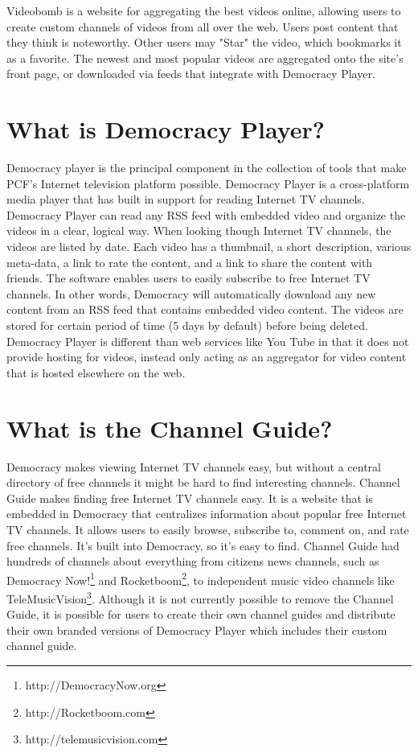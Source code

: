 \documentclass[a4paper,12pt]{report}
\begin{document}
Videobomb is a website for aggregating the best videos online, allowing users to create custom channels of videos from all over the web.
Users post content that they think is noteworthy.
Other users may "Star" the video, which bookmarks it as a favorite.
The newest and most popular videos are aggregated onto the site's front page, or downloaded via feeds that integrate with Democracy Player. 

\section{What is Democracy Player?}
Democracy player is the principal component in the collection of tools that make PCF's Internet television platform possible.
Democracy Player is a cross-platform media player that has built in support for reading Internet TV channels.
Democracy Player can read any RSS feed with embedded video and organize the videos in a clear, logical way.
When looking though Internet TV channels, the videos are listed by date.
Each video has a thumbnail, a short description, various meta-data, a link to rate the content, and a link to share the content with friends.
The software enables users to easily subscribe to free Internet TV channels.
In other words, Democracy will automatically download any new content from an RSS feed that contains embedded video content.
The videos are stored for certain period of time (5 days by default) before being deleted.
Democracy Player is different than web services like You Tube in that it does not provide hosting for videos, instead only acting as an aggregator for video content that is hosted elsewhere on the web.

\section {What is the Channel Guide?}
Democracy makes viewing Internet TV channels easy, but without a central directory of free channels it might be hard to find interesting channels.
Channel Guide makes finding free Internet TV channels easy.
It is a website that is embedded in Democracy that centralizes information about popular free Internet TV channels.
It allows users to easily browse, subscribe to, comment on, and rate free channels.
It's built into Democracy, so it's easy to find.
Channel Guide had hundreds of channels about everything from citizens news channels, such as Democracy Now!\footnote { http://DemocracyNow.org} and Rocketboom\footnote {http://Rocketboom.com}, to independent music video channels like TeleMusicVision\footnote{ http://telemusicvision.com}.
Although it is not currently possible to remove the Channel Guide, it is possible for users to create their own channel guides and distribute their own branded versions of Democracy Player which includes their custom channel guide. 
\end{document}
